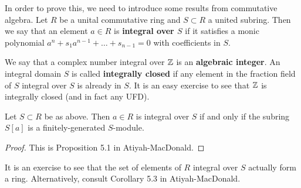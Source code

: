 \documentclass[11pt, english]{article}
\begin{document}
In order to prove this, we need to introduce some results from commutative algebra. Let $R$ be a unital commutative ring and $S \subset R$ a united subring. Then we say that an element $a \in R$ is \textbf{integral over $S$} if it satisfies a monic polynomial $a^n+s_1a^{n-1}+\ldots+s_{n-1}=0$ with coefficients in $S$.

We say that a complex number integral over $\mathbb{Z}$ is an \textbf{algebraic integer}. An integral domain $S$ is called \textbf{integrally closed} if any element in the fraction field of $S$ integral over $S$ is already in $S$. It is an easy exercise to see that $\mathbb{Z}$ is integrally closed (and in fact any UFD). 

\begin{lemma}
 Let $S \subset R$ be as above. Then $a \in R$ is integral over $S$ if and only if the subring $S[a]$ is a finitely-generated $S$-module.
\end{lemma}
\begin{proof}
This is Proposition 5.1 in Atiyah-MacDonald.
\end{proof}

It is an exercise to see that the set of elements of $R$ integral over $S$ actually form a ring. Alternatively, consult Corollary 5.3 in Atiyah-MacDonald.
\end{document}
